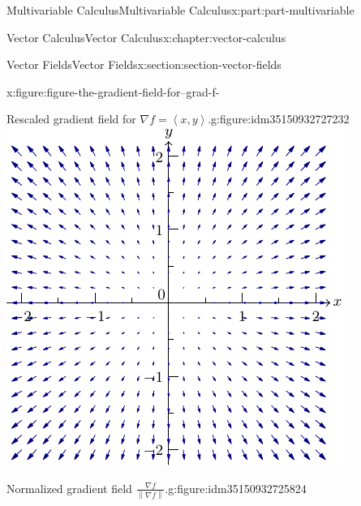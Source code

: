 \documentclass[twoside,10pt,]{tufte-book}
\numberwithin{equation}{part}
\newcommand{\grad}{\nabla}
\newcommand{\norm}[1]{\left\| #1 \right\|}
\newcommand{\dotprod}[1]{\left\langle #1 \right\rangle}
\begin{document}
\begin{partptx}{Multivariable Calculus}{}{Multivariable Calculus}{}{}{x:part:part-multivariable}
\begin{chapterptx}{Vector Calculus}{}{Vector Calculus}{}{}{x:chapter:vector-calculus}
\begin{sectionptx}{Vector Fields}{}{Vector Fields}{}{}{x:section:section-vector-fields}
\begin{introduction}{}
\begin{figureptx}{}{x:figure:figure-the-gradient-field-for--grad-f-}{}
\begin{sidebyside}{2}{0}{0}{0}
\begin{sbspanel}{0.5}
\begin{subfigureptx}{Rescaled gradient field for \(\grad f = \dotprod{x,y}\).}{g:figure:idm35150932727232}{}
\includegraphics[width=\linewidth]{generated/asymptote/image-the-gradient-field-for--grad-f-.pdf}
\tcblower
\end{subfigureptx}%
\end{sbspanel}%
\begin{sbspanel}{0.5}%
\begin{subfigureptx}{Normalized gradient field \(\frac{\grad f}{\norm{\grad f}}\).}{g:figure:idm35150932725824}{}%

\end{subfigureptx}
\end{sbspanel}
\end{sidebyside}
\end{figureptx}
\end{introduction}
\end{sectionptx}
\end{chapterptx}
\end{partptx}
\end{document}
